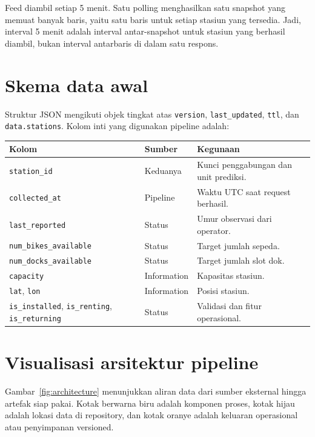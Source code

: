 \documentclass[10pt,a4paper]{article}
\newcommand{\code}[1]{\texttt{#1}}
\begin{document}
Feed diambil setiap 5 menit. Satu polling menghasilkan satu snapshot yang
memuat banyak baris, yaitu satu baris untuk setiap stasiun yang tersedia.
Jadi, interval 5 menit adalah interval antar-snapshot untuk stasiun yang
berhasil diambil, bukan interval antarbaris di dalam satu respons.

\section{Skema data awal}
Struktur JSON mengikuti objek tingkat atas \code{version},
\code{last\_updated}, \code{ttl}, dan \code{data.stations}. Kolom inti yang
digunakan pipeline adalah:

\begin{longtable}{@{}p{}p{}p{}@{}}
\toprule
\textbf{Kolom} & \textbf{Sumber} & \textbf{Kegunaan} \\
\midrule
\code{station\_id} & Keduanya & Kunci penggabungan dan unit prediksi. \\
\code{collected\_at} & Pipeline & Waktu UTC saat request berhasil. \\
\code{last\_reported} & Status & Umur observasi dari operator. \\
\code{num\_bikes\_available} & Status & Target jumlah sepeda. \\
\code{num\_docks\_available} & Status & Target jumlah slot dok. \\
\code{capacity} & Information & Kapasitas stasiun. \\
\code{lat}, \code{lon} & Information & Posisi stasiun. \\
\code{is\_installed}, \code{is\_renting}, \code{is\_returning} & Status & Validasi dan fitur operasional. \\
\bottomrule
\end{longtable}

\section{Visualisasi arsitektur pipeline}
Gambar~\ref{fig:architecture} menunjukkan aliran data dari sumber eksternal
hingga artefak siap pakai. Kotak berwarna biru adalah komponen proses, kotak
hijau adalah lokasi data di repository, dan kotak oranye adalah keluaran
operasional atau penyimpanan versioned.
\end{document}
